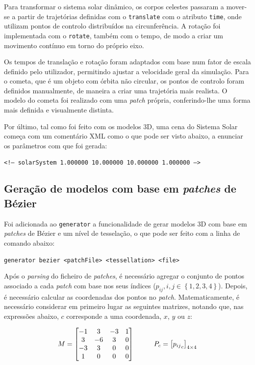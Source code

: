 \documentclass[12pt, a4paper]{article}
\begin{document}
Para transformar o sistema solar dinâmico, os corpos celestes passaram a mover-se a partir de
trajetórias definidas com o \texttt{translate} com o atributo \texttt{time}, onde utilizam
pontos de controlo distribuídos na circunferência. A rotação foi implementada com o \texttt{rotate},
também com o tempo, de modo a criar um movimento contínuo em torno do próprio eixo.

Os tempos de translação e rotação foram adaptados com base num fator de escala definido pelo
utilizador, permitindo ajustar a velocidade geral da simulação. Para o cometa, que é um objeto com
órbita não circular, os pontos de controlo foram definidos manualmente, de maneira a criar uma
trajetória mais realista. O modelo do cometa foi realizado com uma \textit{patch} própria,
conferindo-lhe uma forma mais definida e visualmente distinta.

Por último, tal como foi feito com os modelos 3D, uma cena do Sistema Solar começa com um comentário
XML como o que pode ser visto abaixo, a enunciar os parâmetros com que foi gerada:

\begin{center}
    \texttt{<!-- solarSystem 1.000000 10.000000 10.000000 1.000000 -->}
\end{center}

\subsection{Geração de modelos com base em \emph{patches} de Bézier}

Foi adicionada ao \texttt{generator} a funcionalidade de gerar modelos 3D com base em \emph{patches}
de Bézier e um nível de tesselação, o que pode ser feito com a linha de comando abaixo:

\begin{center}
    \texttt{generator bezier <patchFile> <tessellation> <file>}
\end{center}

Após o \emph{parsing} do ficheiro de \emph{patches}, é necessário agregar o conjunto de pontos
associado a cada \emph{patch} com base nos seus índices
($p_{i j}, i, j \in \left \lbrace 1,2,3,4 \right \rbrace$). Depois, é necessário calcular as
coordenadas dos pontos no \emph{patch}. Matematicamente, é necessário considerar em primeiro lugar
as seguintes matrizes, notando que, nas expressões abaixo, $c$ corresponde a uma coordenada, $x$,
$y$ ou $z$:

$$
\def\arraystretch{1}
M =
\begin{bmatrix}
    -1 &  3 & -3 & 1 \\
     3 & -6 &  3 & 0 \\
    -3 &  3 &  0 & 0 \\
     1 &  0 &  0 & 0
\end{bmatrix}
\hspace{1cm}
P_c = \left [ {p_{i j}}_{c} \right ] _ {4 \times 4}
$$
\end{document}
